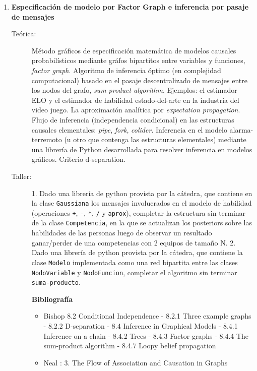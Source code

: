 \documentclass[10pt]{article}
\begin{document}
\begin{enumerate}
\item \textbf{Especificación de modelo por Factor Graph e inferencia por pasaje de mensajes}
\vspace{-0.15cm}
\begin{description}
\item[Teórica:]
Método gráficos de especificación matemática de modelos causales probabilísticos mediante gráfos bipartitos entre variables y funciones, \emph{factor graph}.
Algoritmo de inferencia óptimo (en complejidad computacional) basado en el pasaje descentralizado de mensajes entre los nodos del grafo, \emph{sum-product algorithm}.
Ejemplos: el estimador ELO y el estimador de habilidad estado-del-arte en la industria del video juego.
La aproximación analítica por \emph{expectation propagation}. Flujo de inferencia (independencia condicional) en las estructuras causales elementales: \emph{pipe}, \emph{fork}, \emph{colider}.
Inferencia en el modelo alarma-terremoto (u otro que contenga las estructuras elementales) mediante una librería de Python desarrollada para resolver inferencia en modelos gráficos.
Criterio d-separation.
\item[Taller:]
1. Dado una librería de python provista por la cátedra, que contiene en la clase \texttt{Gaussiana} los mensajes involucrados en el modelo de habilidad (operaciones \texttt{+}, \texttt{-}, \texttt{*}, \texttt{/} y  \texttt{aprox}), completar la estructura sin terminar de la clase \texttt{Competencia}, en la que se actualizan los posteriors sobre las habilidades de las personas luego de observar un resultado ganar/perder de una competencias con 2 equipos de tamaño N.
2. Dado una librería de python provista por la cátedra, que contiene la clase \texttt{Modelo} implementada como una red bipartita entre las clases \texttt{NodoVariable} y \texttt{NodoFuncion}, completar el algoritmo sin terminar \texttt{suma-producto}.
\item[] \textbf{Bibliografía}
\begin{itemize}
\item Bishop \cite{bishop2006-PRML} 8.2 Conditional Independence - 8.2.1 Three example graphs - 8.2.2 D-separation - 8.4 Inference in Graphical Models - 8.4.1 Inference on a chain - 8.4.2 Trees - 8.4.3 Factor graphs - 8.4.4 The sum-product algorithm - 8.4.7 Loopy belief propagation
\item Neal \cite{neal2020}: 3. The Flow of Association and
Causation in Graphs
\end{itemize}
\end{description}


\end{enumerate}
\end{document}
